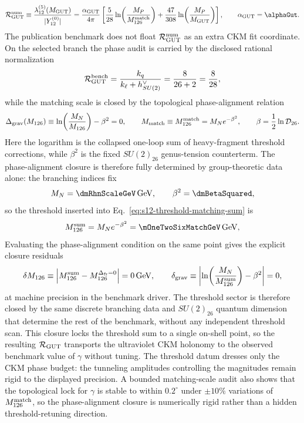 \documentclass[11pt]{article}
\begin{document}
\begin{equation}
 \mathcal R_{\rm GUT}^{\rm num}
 \equiv
 \frac{\lambda_{12}^{(5)}(M_{\rm GUT})}{|Y_{12}^{(0)}|}
 =
 \frac{\alpha_{\rm GUT}}{4\pi}
 \left[
  \frac{5}{28}\ln\!\left(\frac{M_P}{M_{126}^{\rm match}}\right)
  +
  \frac{47}{308}\ln\!\left(\frac{M_P}{M_{\rm GUT}}\right)
 \right],
 \qquad
 \alpha_{\rm GUT}=\alphaGut.
\end{equation}
The publication benchmark does not float $\mathcal R_{\rm GUT}^{\rm num}$ as an
extra CKM fit coordinate. On the selected branch the phase audit is carried by the disclosed rational
normalization
\begin{equation}
 \mathcal R_{\rm GUT}^{\rm bench}
 =
 \frac{k_q}{k_{\ell}+h_{SU(2)}^{\vee}}
 =
 \frac{8}{26+2}
 =
 \frac{8}{28},
\end{equation}
while the matching scale is closed by the topological phase-alignment relation
\begin{equation}
 \Delta_{\rm grav}(M_{126})
 \equiv
 \ln\!\left(\frac{M_N}{M_{126}}\right)-\beta^2=0,
 \qquad
 M_{\rm match}\equiv M_{126}^{\rm match}=M_Ne^{-\beta^2},
  \qquad
 \beta=\frac12\ln\mathcal D_{26}.
\end{equation}
Here the logarithm is the collapsed one-loop sum of heavy-fragment threshold
corrections, while $\beta^2$ is the fixed $SU(2)_{26}$ genus-tension
counterterm. The phase-alignment closure is therefore fully determined by group-theoretic
data alone: the branching indices fix
\begin{equation}
 M_N=\dmRhnScaleGeV\,\mathrm{GeV},
 \qquad
 \beta^2=\dmBetaSquared,
\end{equation}
so the threshold inserted into Eq.~\eqref{eq:s12-threshold-matching-sum} is
\begin{equation}
 M_{126}^{\rm sum}=M_Ne^{-\beta^2}=\mOneTwoSixMatchGeV\,\mathrm{GeV},
\end{equation}
Evaluating the phase-alignment condition on the same point gives the explicit closure residuals
\begin{equation}
 \delta M_{126}\equiv\left|M_{126}^{\rm sum}-M_{126}^{\Delta_{\rm fr}=0}\right|=0\,\mathrm{GeV},
 \qquad
 \delta_{\rm grav}\equiv\left|\ln\!\left(\frac{M_N}{M_{126}^{\rm sum}}\right)-\beta^2\right|=0,
\end{equation}
at machine precision in the benchmark driver. The threshold sector is therefore closed by the same discrete branching data and $SU(2)_{26}$ quantum dimension that determine the rest of the benchmark, without any independent threshold scan.
This closure locks the threshold sum to a single on-shell point, so the
resulting $\mathcal R_{\rm GUT}$ transports the ultraviolet CKM holonomy to the
observed benchmark value of $\gamma$ without tuning. The threshold datum
dresses only the CKM phase budget: the tunneling amplitudes controlling the
magnitudes remain rigid to the displayed precision.
A bounded matching-scale audit also shows that the topological lock for $\gamma$ is stable to within $0.2^\circ$ under $\pm10\%$ variations of $M_{126}^{\rm match}$, so the phase-alignment closure is numerically rigid rather than a hidden threshold-retuning direction.
\end{document}
